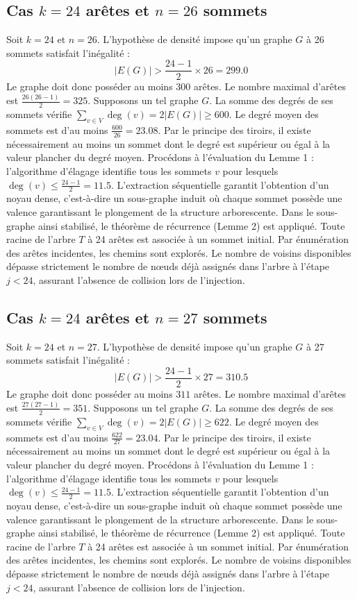 \documentclass[12pt,a4paper]{article}
\begin{document}
\subsection{Cas $k = 24$ arêtes et $n = 26$ sommets}
Soit $k = 24$ et $n = 26$. L'hypothèse de densité impose qu'un graphe $G$ à 26 sommets satisfait l'inégalité :
$$ |E(G)| > \frac{24-1}{2} \times 26 = 299.0 $$
Le graphe doit donc posséder au moins $300$ arêtes. Le nombre maximal d'arêtes est $\frac{26(26-1)}{2} = 325$.
Supposons un tel graphe $G$. La somme des degrés de ses sommets vérifie $\sum_{v \in V} \deg(v) = 2|E(G)| \geq 600$.
Le degré moyen des sommets est d'au moins $\frac{600}{26} = 23.08$.
Par le principe des tiroirs, il existe nécessairement au moins un sommet dont le degré est supérieur ou égal à la valeur plancher du degré moyen.
Procédons à l'évaluation du Lemme 1 : l'algorithme d'élagage identifie tous les sommets $v$ pour lesquels $\deg(v) \leq \frac{24-1}{2} = 11.5$.
L'extraction séquentielle garantit l'obtention d'un noyau dense, c'est-à-dire un sous-graphe induit où chaque sommet possède une valence garantissant le plongement de la structure arborescente.
Dans le sous-graphe ainsi stabilisé, le théorème de récurrence (Lemme 2) est appliqué. Toute racine de l'arbre $T$ à 24 arêtes est associée à un sommet initial. Par énumération des arêtes incidentes, les chemins sont explorés. Le nombre de voisins disponibles dépasse strictement le nombre de nœuds déjà assignés dans l'arbre à l'étape $j < 24$, assurant l'absence de collision lors de l'injection.

\subsection{Cas $k = 24$ arêtes et $n = 27$ sommets}
Soit $k = 24$ et $n = 27$. L'hypothèse de densité impose qu'un graphe $G$ à 27 sommets satisfait l'inégalité :
$$ |E(G)| > \frac{24-1}{2} \times 27 = 310.5 $$
Le graphe doit donc posséder au moins $311$ arêtes. Le nombre maximal d'arêtes est $\frac{27(27-1)}{2} = 351$.
Supposons un tel graphe $G$. La somme des degrés de ses sommets vérifie $\sum_{v \in V} \deg(v) = 2|E(G)| \geq 622$.
Le degré moyen des sommets est d'au moins $\frac{622}{27} = 23.04$.
Par le principe des tiroirs, il existe nécessairement au moins un sommet dont le degré est supérieur ou égal à la valeur plancher du degré moyen.
Procédons à l'évaluation du Lemme 1 : l'algorithme d'élagage identifie tous les sommets $v$ pour lesquels $\deg(v) \leq \frac{24-1}{2} = 11.5$.
L'extraction séquentielle garantit l'obtention d'un noyau dense, c'est-à-dire un sous-graphe induit où chaque sommet possède une valence garantissant le plongement de la structure arborescente.
Dans le sous-graphe ainsi stabilisé, le théorème de récurrence (Lemme 2) est appliqué. Toute racine de l'arbre $T$ à 24 arêtes est associée à un sommet initial. Par énumération des arêtes incidentes, les chemins sont explorés. Le nombre de voisins disponibles dépasse strictement le nombre de nœuds déjà assignés dans l'arbre à l'étape $j < 24$, assurant l'absence de collision lors de l'injection.
\end{document}
